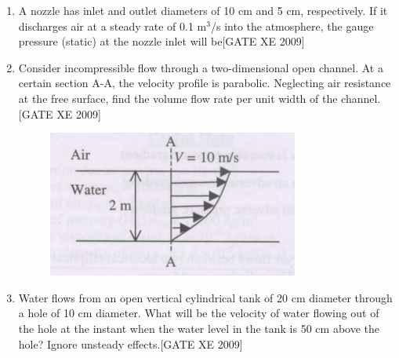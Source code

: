 \documentclass[journal,12pt,onecolumn]{IEEEtran}
\theoremstyle{remark}
\begin{document}
\begin{enumerate}
\item A nozzle has inlet and outlet diameters of 10 cm and 5 cm, respectively. If it discharges air at a steady rate of 0.1 m$^3$/s into the atmosphere, the gauge pressure (static) at the nozzle inlet will be\hfill[GATE XE 2009]

\begin{enumerate}
\end{enumerate}




\item Consider incompressible flow through a two-dimensional open channel. At a certain section A-A, the velocity profile is parabolic. Neglecting air resistance at the free surface, find the volume flow rate per unit width of the channel.\hfill[GATE XE 2009]
\begin{figure}[H]
    \centering
    \includegraphics[width=0.5\linewidth]{figs/fig2.png}
    \caption*{}
    \label{fig:Q.24}
\end{figure}
\begin{enumerate}
\end{enumerate}




\item Water flows from an open vertical cylindrical tank of 20 cm diameter through a hole of 10 cm diameter. What will be the velocity of water flowing out of the hole at the instant when the water level in the tank is 50 cm above the hole? Ignore unsteady effects.\hfill[GATE XE 2009]
\begin{enumerate}
\end{enumerate}






\end{enumerate}
\end{document}
